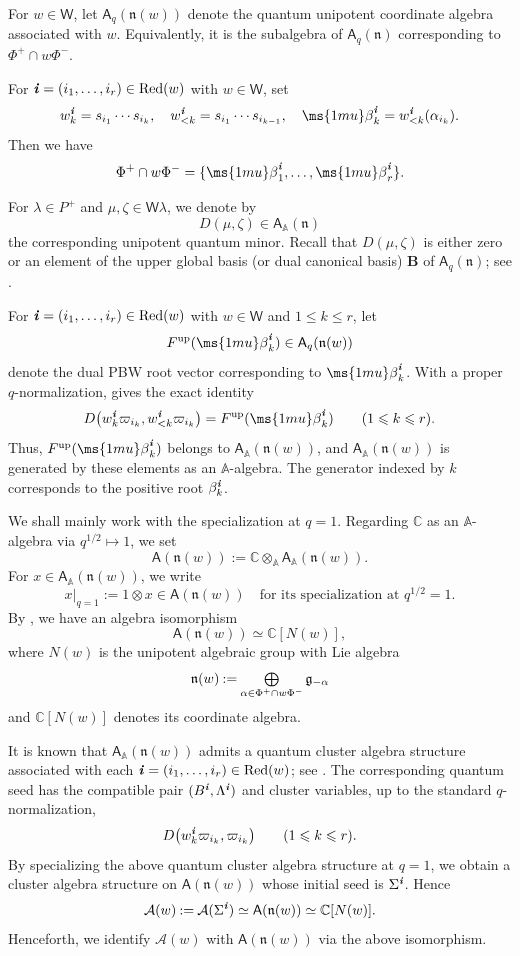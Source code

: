 \documentclass[12pt, leqno]{amsart}
\numberwithin{equation}{section}
\theoremstyle{plain}
\theoremstyle{definition}
\renewcommand{\le}{\leqslant}
\newcommand{\seteq}{\mathbin{:=}}
\newcommand{\soplus}{\mathop{\mbox{\normalsize$\bigoplus$}}\limits}
\newcommand{\g}{\mathfrak{g}}
\newcommand{\n}{\mathfrak{n}}
\newcommand{\C}{\mathbb{C}}
\newcommand{\be}{{\ms{1mu}\beta}}
\newcommand{\La}{\Lambda}
\newcommand{\up}{{\rm up}}
\newcommand{\ii}{ \textbf{\textit{i}}}
\newcommand{\sfA}{\mathsf{A}}
\newcommand{\sfW}{\mathsf{W}}
\newcommand{\bbA}{\mathbb{A}}
\newcommand{\bfB}{\mathbf{B}}
\newcommand{\calA}{\mathcal{A}}
\newcommand{\weyl}{\sfW}
\newcommand{\Red}{\mathrm{Red}}
\begin{document}
For $w\in \weyl$, let $\sfA_q(\n(w))$ denote the quantum
unipotent coordinate algebra associated with $w$.
Equivalently, it is the subalgebra of $\sfA_q(\n)$
corresponding to $\Phi^+\cap w\Phi^-$.

For $\ii=(i_1,\ldots,i_r)\in\Red(w)$ with $w\in\weyl$, set
\[
w_k^\ii=s_{i_1}\cdots s_{i_k}, \quad w_{<k}^\ii=s_{i_1}\cdots s_{i_{k-1}}, \quad \be_k^\ii=w_{<k}^\ii(\alpha_{i_k}).
\]
Then we have
\[
\Phi^+\cap w\Phi^- = \{\be_1^\ii,\ldots,\be_r^\ii\}.
\]

For $\lambda\in P^+$ and $\mu,\zeta\in\weyl\lambda$, we denote by
\[
D(\mu,\zeta)\in\sfA_\bbA(\n)
\]
the corresponding unipotent quantum minor.  Recall that
$D(\mu,\zeta)$ is either zero or an element of the upper global basis (or dual canonical basis) $\bfB$
of $\sfA_q(\n)$; see \cite[Section~9.1]{KKKO18}.

For $\ii=(i_1,\ldots,i_r)\in\Red(w)$ with $w\in\weyl$ and
$1\le k\le r$, let
\[
F^{\up}(\be_k^\ii)\in\sfA_q(\n(w))
\]
denote the dual PBW root vector corresponding to $\be_k^\ii$.
With a proper $q$-normalization, \cite[Section~5.1.1]{KK24}{} gives the exact identity
\[
D\bigl(w_k^\ii\varpi_{i_k},w_{<k}^\ii\varpi_{i_k}\bigr)
=F^{\up}(\be_k^\ii)
\qquad (1\le k\le r).
\]
Thus, $F^{\up}(\be_k^\ii)$ belongs to $\sfA_\bbA(\n(w))$, and
$\sfA_\bbA(\n(w))$ is generated by these elements as an
$\bbA$-algebra. The generator indexed by $k$ corresponds to the positive
root $\beta_k^\ii$.

We shall mainly work with the specialization at $q=1$.  Regarding
$\C$ as an $\bbA$-algebra via $q^{1/2}\mapsto 1$, we set
\[
\sfA(\n(w)) \seteq \C\otimes_{\bbA}\sfA_\bbA(\n(w)).
\]
For $x\in\sfA_\bbA(\n(w))$, we write
\[
x|_{q=1}\seteq 1\otimes x\in\sfA(\n(w)) \quad \text{for its specialization at $q^{1/2}=1$.}
\]
By \cite[Theorem~4.39]{Kimura12}, we have an algebra isomorphism
\[
\sfA(\n(w))\simeq \C[N(w)],
\]
where $N(w)$ is the unipotent algebraic group with Lie algebra
$$\n(w) \seteq \soplus_{\alpha\in\Phi^+\cap w\Phi^-}\g_{-\alpha}$$ and $\C[N(w)]$ denotes its coordinate algebra.

It is known that $\sfA_\bbA(\n(w))$ admits a quantum cluster
algebra structure associated with each
$\ii=(i_1,\ldots,i_r)\in\Red(w)$; see
\cite{GLS11,GY17,GY21,KKKO18,Qin20}.  The corresponding quantum seed has the compatible pair $(B^\ii,\La^\ii)$
and cluster variables, up to the standard $q$-normalization,
\[
D\bigl(w_k^\ii\varpi_{i_k},\varpi_{i_k}\bigr) \qquad (1\le k\le r).
\]
By specializing the above quantum cluster algebra structure at $q=1$,
we obtain a cluster algebra structure on $\sfA(\n(w))$ whose initial
seed is $\Sigma^\ii$. Hence
\[
\calA(w) \seteq \calA(\Sigma^\ii) \simeq \sfA(\n(w)) \simeq \C[N(w)].
\]
Henceforth, we identify $\calA(w)$ with $\sfA(\n(w))$ via the above
isomorphism.
\end{document}
